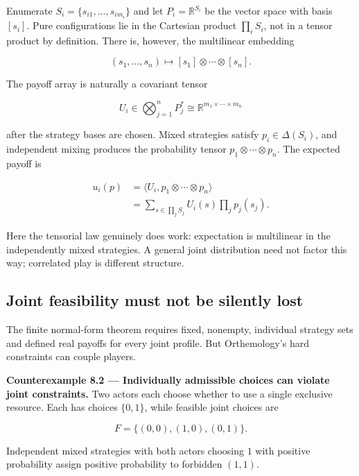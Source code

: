 \documentclass[11pt,a4paper]{article}
\begin{document}
Enumerate \(S_i=\{s_{i1},\ldots,s_{im_i}\}\) and let
\(P_i=\mathbb R^{S_i}\) be the vector space with basis \([s_i]\). Pure
configurations lie in the Cartesian product \(\prod_iS_i\), not in a
tensor product by definition. There is, however, the multilinear
embedding

\nopagebreak[4]

\[
(s_1,\ldots,s_n)\longmapsto[s_1]\otimes\cdots\otimes[s_n].
\]

The payoff array is naturally a covariant tensor

\nopagebreak[4]

\[
U_i\in\bigotimes_{j=1}^nP_j^*\cong
\mathbb R^{m_1\times\cdots\times m_n}
\]

after the strategy bases are chosen. Mixed strategies satisfy
\(p_i\in\Delta(S_i)\), and independent mixing produces the probability
tensor \(p_1\otimes\cdots\otimes p_n\). The expected payoff is

\nopagebreak[4]

\[
\begin{aligned}
u_i(p)&=\langle U_i,p_1\otimes\cdots\otimes p_n\rangle\\
&=\sum_{s\in\prod_jS_j}U_i(s)\prod_jp_j(s_j).
\end{aligned}
\]

Here the tensorial law genuinely does work: expectation is multilinear
in the independently mixed strategies. A general joint distribution need
not factor this way; correlated play is different structure.

\subsection{Joint feasibility must not be silently
lost}\label{joint-feasibility-must-not-be-silently-lost}

The finite normal-form theorem requires fixed, nonempty, individual
strategy sets and defined real payoffs for every joint profile. But
Orthemology's hard constraints can couple players.


\textbf{Counterexample 8.2 --- Individually admissible choices can
violate joint constraints.} Two actors each choose whether to use a
single exclusive resource. Each has choices \(\{0,1\}\), while feasible
joint choices are

\nopagebreak[4]

\[F=\{(0,0),(1,0),(0,1)\}.\]

Independent mixed strategies with both actors choosing \(1\) with
positive probability assign positive probability to forbidden \((1,1)\).
\end{document}
